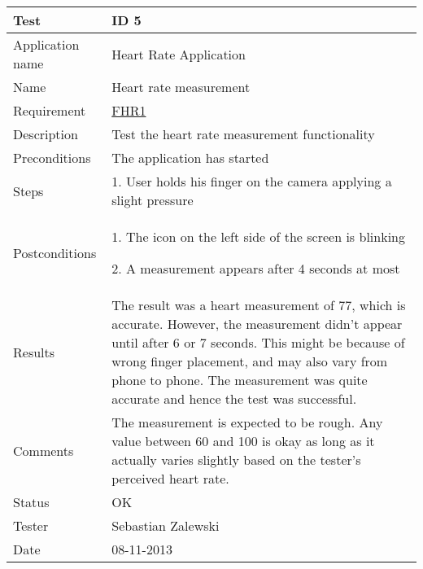 \begin{table}
\begin{center}
\begin{tabular}{ | l | p{10cm} | }
	\hline
	\textbf{Test}	&	\textbf{ID 5} \\
	\hline\noalign{\smallskip}\noalign{\smallskip}\hline
	Application name	& Heart Rate Application \\
	Name				& Heart rate measurement \\
	Requirement			& \hyperref[table:reqheartrate]{FHR1} \\
	Description			& Test the heart rate measurement functionality \\
	Preconditions		& The application has started \\
	Steps 				&	\par 1. User holds his finger on the camera applying a slight pressure \\
	Postconditions		&	\par 1. The icon on the left side of the screen is blinking 
							\par 2. A measurement appears after 4 seconds at most \\
	Results				& The result was a heart measurement of 77, which is accurate.
						  However, the measurement didn't appear until after 6 or 7 seconds.
						  This might be because of wrong finger placement, and may also vary from phone to phone.
						  The measurement was quite accurate and hence the test was successful. \\
	Comments			&	The measurement is expected to be rough.
							Any value between 60 and 100 is okay as long as it actually varies slightly based
							on the tester's perceived heart rate.  \\
	Status				& OK \\
	Tester				& Sebastian Zalewski \\
	Date				& 08-11-2013 \\
	\hline
\end{tabular}
\end{center}
\end{table}

